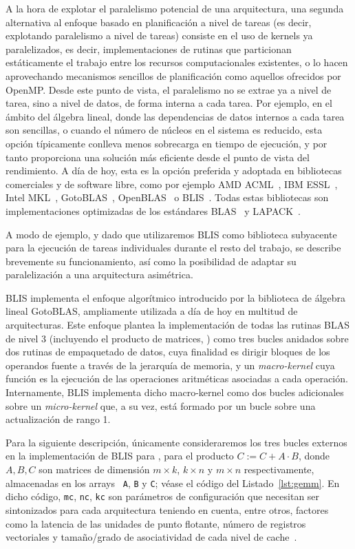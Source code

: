 A la hora de explotar el paralelismo potencial de una arquitectura, una
segunda alternativa al enfoque basado en planificación a nivel de tareas (es
decir, explotando paralelismo a nivel de tareas) consiste en el uso de
kernels ya paralelizados, es decir, implementaciones de rutinas que
particionan estáticamente el trabajo entre los recursos computacionales
existentes, o lo hacen aprovechando mecanismos sencillos de planificación
como aquellos ofrecidos por OpenMP. Desde este punto de vista, el
paralelismo no se extrae ya a nivel de tarea, sino a nivel de datos, de
forma interna a cada tarea. Por ejemplo, en el ámbito del álgebra lineal,
donde las dependencias de datos internos a cada tarea son sencillas, o
cuando el número de núcleos en el sistema es reducido, esta opción
típicamente conlleva menos sobrecarga en tiempo de ejecución, y por tanto
proporciona una solución más eficiente desde el punto de vista del
rendimiento. A día de hoy, esta es la opción preferida y adoptada en
bibliotecas comerciales y de software libre, como por ejemplo AMD
ACML~\cite{ACML}, IBM ESSL~\cite{ESSL}, Intel MKL~\cite{mkl},
GotoBLAS~\cite{Goto:2008:AHP}, OpenBLAS~\cite{OpenBLAS} o
BLIS~\cite{BLIS1}. Todas estas bibliotecas son implementaciones optimizadas
de los estándares BLAS~\cite{blas1,blas2,blas3} y LAPACK~\cite{lapack}.

A modo de ejemplo, y dado que utilizaremos BLIS como biblioteca subyacente para la ejecución de tareas
individuales durante el resto del trabajo, se describe brevemente su funcionamiento, así como la posibilidad
de adaptar su paralelización a una arquitectura asimétrica.

BLIS implementa el enfoque algorítmico introducido por la biblioteca de álgebra lineal GotoBLAS, ampliamente
utilizada a día de hoy en multitud de arquitecturas. Este enfoque plantea la implementación de todas las rutinas
BLAS de nivel 3 (incluyendo el producto de matrices, \gemm) como tres bucles anidados sobre dos rutinas de 
empaquetado de datos, cuya finalidad es dirigir bloques de los operandos fuente a través de la jerarquía
de memoria, y un {\em macro-kernel} cuya función es la ejecución de las operaciones aritméticas asociadas
a cada operación. Internamente, BLIS implementa dicho macro-kernel como dos bucles adicionales sobre un 
{\em micro-kernel} que, a su vez, está formado por un bucle sobre una actualización de rango 1.

Para la siguiente descripción, únicamente consideraremos los tres bucles
externos en la implementación de BLIS para \gemm, para el producto
$C:=C+A\cdot B$, donde $A,B,C$ son matrices de dimensión $m \times k$,
$k\times n$ y $m \times n$ respectivamente, almacenadas en los arrays {\tt
  A}, {\tt B} y {\tt C}; véase el código del Listado~\ref{lst:gemm}.  En
dicho código, {\tt mc}, {\tt nc}, {\tt kc} son parámetros de configuración
que necesitan ser sintonizados para cada arquitectura teniendo en cuenta,
entre otros, factores como la latencia de las unidades de punto flotante,
número de registros vectoriales y tamaño/grado de asociatividad de cada
nivel de cache~\cite{BLIS4}.

